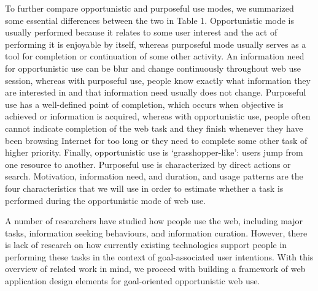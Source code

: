 \documentclass{casconpaper}
\begin{document}
{To further compare opportunistic and purposeful use modes, we summarized some essential differences between the two in Table 1. Opportunistic mode is usually performed because it relates to some user interest  and the act of performing it is enjoyable by itself, whereas purposeful mode usually serves as a tool for completion or continuation of some other activity. An information need for opportunistic use can be blur and change continuously throughout web use session, whereas with purposeful use, people know exactly what information they are interested in and that information need usually does not change. Purposeful use has a well-defined point of completion, which occurs when objective is achieved or information is acquired, whereas with opportunistic use, people often cannot indicate completion of the web task and they finish whenever they have been browsing Internet for too long or they need to complete some other task of higher priority. Finally, opportunistic use is ‘grasshopper-like’: users jump from one resource to another. Purposeful use is characterized by direct actions or search. Motivation, information need, and duration, and usage patterns are the four characteristics that we will use in order to estimate whether a task is performed during the opportunistic mode of web use.

A number of researchers have studied how people use the web, including major tasks, information seeking behaviours, and information curation. However, there is lack of research on how currently existing technologies support people in performing these tasks in the context of goal-associated user intentions. With this overview of related work in mind, we proceed with building a framework of web application design elements for goal-oriented opportunistic web use.
} %
\end{document}
